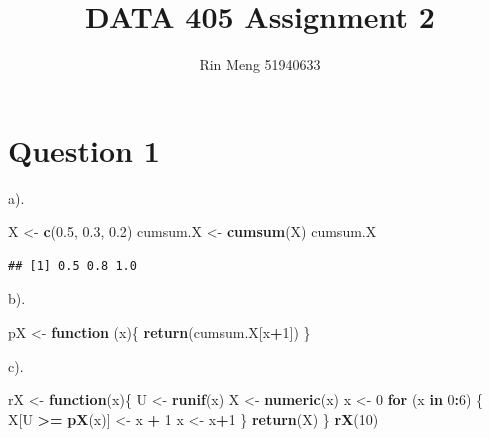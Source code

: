 \documentclass[
]{article}
\title{DATA 405 Assignment 2}
\author{Rin Meng 51940633}
\date{}
\newenvironment{Shaded}{\begin{snugshade}}{\end{snugshade}}
\newcommand{\ControlFlowTok}[1]{\textcolor[rgb]{0.13,0.29,0.53}{\textbf{#1}}}
\newcommand{\DecValTok}[1]{\textcolor[rgb]{0.00,0.00,0.81}{#1}}
\newcommand{\FloatTok}[1]{\textcolor[rgb]{0.00,0.00,0.81}{#1}}
\newcommand{\FunctionTok}[1]{\textcolor[rgb]{0.13,0.29,0.53}{\textbf{#1}}}
\newcommand{\NormalTok}[1]{#1}
\newcommand{\OtherTok}[1]{\textcolor[rgb]{0.56,0.35,0.01}{#1}}
\newcommand{\SpecialCharTok}[1]{\textcolor[rgb]{0.81,0.36,0.00}{\textbf{#1}}}
\begin{document}
\maketitle

\section{Question 1}\label{question-1}

a).

\begin{Shaded}
\begin{Highlighting}[]
\NormalTok{X }\OtherTok{\textless{}{-}} \FunctionTok{c}\NormalTok{(}\FloatTok{0.5}\NormalTok{, }\FloatTok{0.3}\NormalTok{, }\FloatTok{0.2}\NormalTok{)}
\NormalTok{cumsum.X }\OtherTok{\textless{}{-}} \FunctionTok{cumsum}\NormalTok{(X)}
\NormalTok{cumsum.X}
\end{Highlighting}
\end{Shaded}

\begin{verbatim}
## [1] 0.5 0.8 1.0
\end{verbatim}

b).

\begin{Shaded}
\begin{Highlighting}[]
\NormalTok{pX }\OtherTok{\textless{}{-}} \ControlFlowTok{function}\NormalTok{ (x)\{}
  \FunctionTok{return}\NormalTok{(cumsum.X[x}\SpecialCharTok{+}\DecValTok{1}\NormalTok{])}
\NormalTok{\}}
\end{Highlighting}
\end{Shaded}

c).

\begin{Shaded}
\begin{Highlighting}[]
\NormalTok{rX }\OtherTok{\textless{}{-}} \ControlFlowTok{function}\NormalTok{(x)\{}
\NormalTok{  U }\OtherTok{\textless{}{-}} \FunctionTok{runif}\NormalTok{(x)}
\NormalTok{  X }\OtherTok{\textless{}{-}} \FunctionTok{numeric}\NormalTok{(x)}
\NormalTok{  x }\OtherTok{\textless{}{-}} \DecValTok{0}
  \ControlFlowTok{for}\NormalTok{ (x }\ControlFlowTok{in} \DecValTok{0}\SpecialCharTok{:}\DecValTok{6}\NormalTok{) \{}
\NormalTok{    X[U }\SpecialCharTok{\textgreater{}=} \FunctionTok{pX}\NormalTok{(x)] }\OtherTok{\textless{}{-}}\NormalTok{ x }\SpecialCharTok{+} \DecValTok{1}
\NormalTok{    x }\OtherTok{\textless{}{-}}\NormalTok{ x}\SpecialCharTok{+}\DecValTok{1}
\NormalTok{  \}}
  \FunctionTok{return}\NormalTok{(X)}
\NormalTok{\}}
\FunctionTok{rX}\NormalTok{(}\DecValTok{10}\NormalTok{)}
\end{Highlighting}
\end{Shaded}
\end{document}
